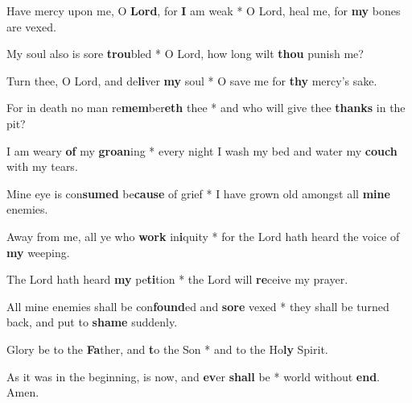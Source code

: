 \begin{multicols}{2}
	Have mercy upon me, O \textbf{Lord}, for \textbf{I }am weak * O Lord, heal me, for \textbf{my} bones are vexed.
	
	My soul also is sore \textbf{trou}bled * O Lord, how long wilt \textbf{thou} punish me?
	
	Turn thee, O Lord, and de\textbf{li}ver \textbf{my} soul * O save me for \textbf{thy} mercy's sake.
	
	For in death no man re\textbf{mem}ber\textbf{eth} thee * and who will give thee \textbf{thanks} in the pit?
	
	I am weary \textbf{of} my \textbf{groan}ing * every night I wash my bed and water my \textbf{couch} with my tears.
	
	Mine eye is con\textbf{sumed} be\textbf{cause} of grief * I have grown old amongst all \textbf{mine} enemies.
	
	Away from me, all ye who \textbf{work} in\textbf{i}quity * for the Lord hath heard the voice of \textbf{my} weeping.
	
	The Lord hath heard \textbf{my} pe\textbf{ti}tion * the Lord will \textbf{re}ceive my prayer.
	
	All mine enemies shall be con\textbf{found}ed and \textbf{sore} vexed * they shall be turned back, and put to \textbf{shame} suddenly.
	
	Glory be to the \textbf{Fa}ther, and \textbf{t}o the Son * and to the Ho\textbf{ly} Spirit.
	
	As it was in the beginning, is now, and \textbf{ev}er \textbf{shall} be * world without \textbf{end}. Amen.
\end{multicols}